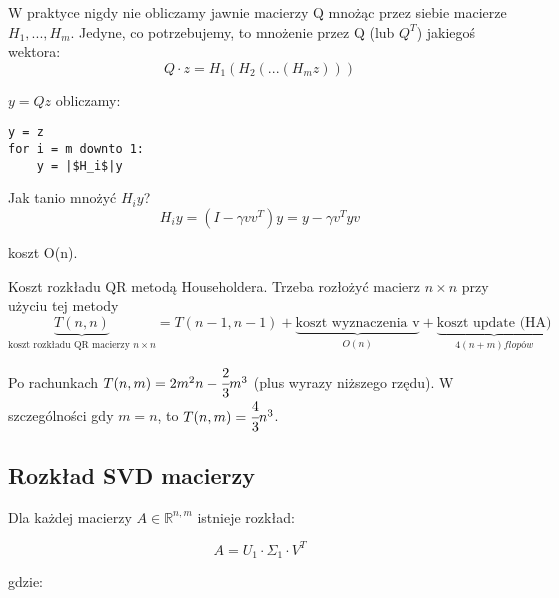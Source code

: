 \documentclass[hidelinks,a4paper,fleqn,oneside]{book}
\newcommand{\RR}{\mathbb{R}}
\newcommand{\ra}{\rightarrow}
\newcommand{\norm}[1]{\left\lVert#1\right\rVert}
\begin{document}
W praktyce nigdy nie obliczamy jawnie macierzy Q mnożąc przez siebie macierze $H_1, ..., H_m$. Jedyne, co potrzebujemy, to mnożenie przez Q (lub $Q^T$) jakiegoś wektora:
\[
	Q \cdot z = H_1(H_2(...(H_{m}z)))
\]

$y = Qz$ obliczamy:
\begin{verbatim}
y = z
for i = m downto 1:
    y = |$H_i$|y
\end{verbatim}

Jak tanio mnożyć $H_i y$?
\[
	H_i y = (I - \gamma vv^T)y = y - \gamma v^Tyv
\]

koszt O(n).

Koszt rozkładu QR metodą Householdera. Trzeba rozłożyć macierz $n \times n$ przy użyciu tej metody
\[
	\underbrace{T(n, n)}_{\textrm{koszt rozkładu QR macierzy }n \times n} = T(n-1, n-1) + \underbrace{\textrm{koszt wyznaczenia v}}_{O(n)} + \underbrace{\textrm{koszt update (HA)}}_{4(n+m) flopów}
\]

Po rachunkach $T(n, m) = 2m^2n - \cfrac{2}{3}m^3$ (plus wyrazy niższego rzędu). W szczególności gdy $m = n$, to $T(n, m) = \cfrac{4}{3} n^3$.

\subsection{Rozkład SVD macierzy} 
%
%


Dla każdej macierzy $A \in \RR^{n, m}$ istnieje rozkład:

\[
	A = U_1 \cdot \Sigma_1 \cdot V^T
\]

gdzie:

\end{document}
